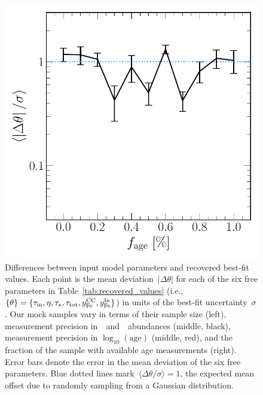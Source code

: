 \documentclass[ms.tex]{subfiles}
\begin{document}
\begin{figure}
\includegraphics[scale = 0.42]{dp_sigma_agefrac.pdf}
\caption{
Differences between input model parameters and recovered best-fit values.
Each point is the mean deviation~$\left|\Delta\theta\right|$ for each of the
six free parameters in Table~\ref{tab:recovered_values} (i.e.,
$\{\theta\} = \{\tau_\text{in}, \eta, \tau_\star, \tau_\text{tot}, y_\text{Fe}^\text{CC},
y_\text{Fe}^\text{Ia}\}$) in units of the best-fit uncertainty~$\sigma$.
Our mock samples vary in terms of their sample size (left), measurement
precision in~\feh~and~\afe~abundances (middle, black), measurement precision in
$\log_{10}(\text{age})$ (middle, red), and the fraction of the sample with
available age measurements (right).
Error bars denote the error in the mean deviation of the six free parameters.
Blue dotted lines mark~$\langle \Delta \theta / \sigma \rangle = 1$, the
expected mean offset due to randomly sampling from a Gaussian distribution.
}
\label{fig:accuracy}
\end{figure}
\end{document}
